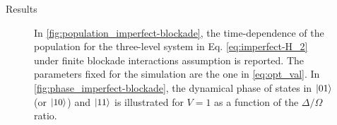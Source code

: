 \documentclass[8pt]{beamer}
\begin{document}
\begin{frame}{Results}
\begin{figure}[H]
\begin{minipage}[]{0.49\linewidth}
        \end{minipage}
        \caption{In \ref{fig:population_imperfect-blockade}, the time-dependence of the population for the three-level system in Eq. \eqref{eq:imperfect-H_2} under finite blockade interactions assumption is reported. The parameters fixed for the simulation are the one in \eqref{eq:opt_val}. In \ref{fig:phase_imperfect-blockade}, the dynamical phase of states in $\ket{01}$ (or $\ket{10}$) and $\ket{11}$ is illustrated for $V=1$ as a function of the $\Delta/\Omega$ ratio. }
        \label{fig:population_phase_imperfect_blockade}
        \end{figure}
    \end{frame}
 
\end{document}
